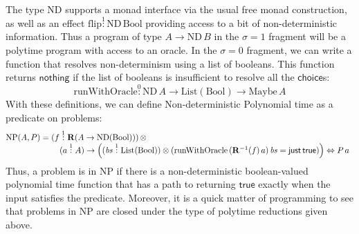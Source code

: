 \documentclass[acmsmall,screen]{acmart}
\newcommand{\BoolTy}{\mathrm{Bool}}
\newcommand{\cTrue}{\mathsf{true}}
\newcommand{\cFalse}{\mathsf{false}}
\newcommand{\ListTy}{\mathrm{List}}
\newcommand{\cNil}{\mathsf{nil}}
\begin{document}
The type $\mathrm{ND}$ supports a monad interface via the usual free
monad construction, as well as an effect
$\mathrm{flip} \stackrel1: \mathrm{ND}\,\BoolTy$ providing access to a
bit of non-deterministic information. Thus a program of type
$A \to \mathrm{ND}\,B$ in the $\sigma = 1$ fragment will be a polytime
program with access to an oracle. In the $\sigma = 0$ fragment, we can
write a function that resolves non-determinism using a list of
booleans. This function returns $\mathsf{nothing}$ if the list of
booleans is insufficient to resolve all the $\mathsf{choice}$s:
\begin{displaymath}
  \mathrm{runWithOracle} \stackrel0: \mathrm{ND}\,A \to \ListTy(\BoolTy) \to \mathrm{Maybe}\,A
\end{displaymath}
With these definitions, we can define Non-deterministic Polynomial
time as a predicate on problems:
\begin{displaymath}
  \mathrm{NP}(A,P) =
  \begin{array}[t]{@{}l}
    (f \stackrel1: \mathbf{R}(A \to \mathrm{ND}(\BoolTy)))\, \otimes \\
    \quad (a \stackrel1: A) \to \left((\mathit{bs} \stackrel1: \ListTy(\BoolTy)) \otimes (\mathrm{runWithOracle}\,(\mathbf{R}^{-1}(f)\,a)\,\mathit{bs} = \mathsf{just}\,\cTrue)\right) \Leftrightarrow P\,a
  \end{array}
\end{displaymath}
Thus, a problem is in NP if there is a non-deterministic
boolean-valued polynomial time function that has a path to returning
$\cTrue$ exactly when the input satisfies the predicate. Moreover, it is a
quick matter of programming to see that problems in NP are closed
under the type of polytime reductions given above.

\end{document}
